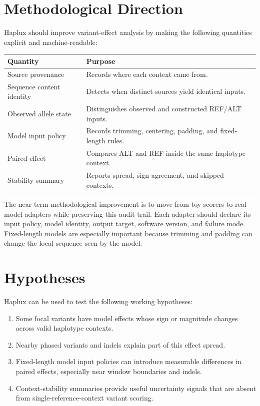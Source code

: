 \documentclass[11pt]{article}
\begin{document}
\section{Methodological Direction}

Haplux should improve variant-effect analysis by making the following quantities
explicit and machine-readable:

\begin{table}[h]
\centering
\begin{tabular}{@{}ll@{}}
\toprule
Quantity & Purpose \\
\midrule
Source provenance & Records where each context came from. \\
Sequence content identity & Detects when distinct sources yield identical inputs. \\
Observed allele state & Distinguishes observed and constructed REF/ALT inputs. \\
Model input policy & Records trimming, centering, padding, and fixed-length rules. \\
Paired effect & Compares ALT and REF inside the same haplotype context. \\
Stability summary & Reports spread, sign agreement, and skipped contexts. \\
\bottomrule
\end{tabular}
\end{table}

The near-term methodological improvement is to move from toy scorers to real
model adapters while preserving this audit trail. Each adapter should declare
its input policy, model identity, output target, software version, and failure
mode. Fixed-length models are especially important because trimming and padding
can change the local sequence seen by the model.

\section{Hypotheses}

Haplux can be used to test the following working hypotheses:

\begin{enumerate}
  \item Some focal variants have model effects whose sign or magnitude changes
        across valid haplotype contexts.
  \item Nearby phased variants and indels explain part of this effect spread.
  \item Fixed-length model input policies can introduce measurable differences
        in paired effects, especially near window boundaries and indels.
  \item Context-stability summaries provide useful uncertainty signals that are
        absent from single-reference-context variant scoring.
\end{enumerate}
\end{document}
